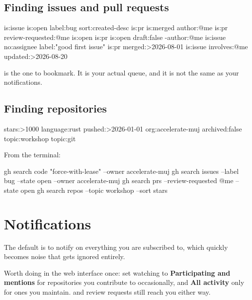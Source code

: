 \documentclass[11pt]{article}
\begin{document}
\subsection{Finding issues and pull requests}

\begin{terminal}
is:issue is:open label:bug sort:created-desc
is:pr is:merged author:@me
is:pr review-requested:@me is:open
is:pr is:open draft:false -author:@me
is:issue no:assignee label:"good first issue"
is:pr merged:>2026-08-01
is:issue involves:@me updated:>2026-08-20
\end{terminal}

 is the one to bookmark. It is your actual queue,
and it is not the same as your notifications.

\subsection{Finding repositories}

\begin{terminal}
stars:>1000 language:rust pushed:>2026-01-01
org:accelerate-muj archived:false
topic:workshop topic:git
\end{terminal}

From the terminal:

\begin{shell}
gh search code "force-with-lease" --owner accelerate-muj
gh search issues --label bug --state open --owner accelerate-muj
gh search prs --review-requested @me --state open
gh search repos --topic workshop --sort stars
\end{shell}

\section{Notifications}

The default is to notify on everything you are subscribed to, which quickly becomes
noise that gets ignored entirely.


Worth doing in the web interface once: set watching to \textbf{Participating and
mentions} for repositories you contribute to occasionally, and \textbf{All activity}
only for ones you maintain.  and review requests still reach you either
way.
\end{document}
